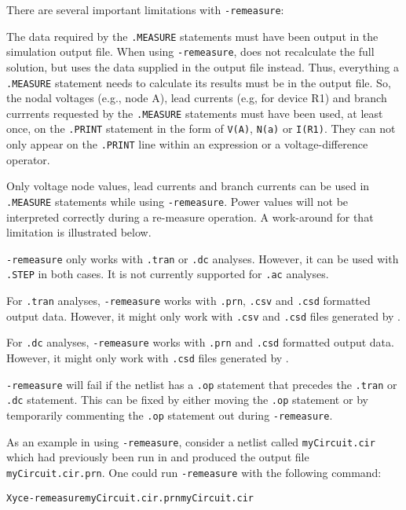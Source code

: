 There are several important limitations with {\tt -remeasure}:
\begin{XyceItemize}
  \item The data required by the {\tt .MEASURE} statements must have been output 
  in the simulation output file.  When using {\tt -remeasure}, \Xyce{} does not 
  recalculate the full solution, but uses the data supplied in the output
  file instead.  Thus, everything a {\tt .MEASURE} statement needs to calculate its 
  results must be in the output file.  So, the nodal voltages (e.g., node A), lead
  currents (e.g, for device R1) and branch currrents requested by the {\tt .MEASURE} 
  statements must have been used, at least once, on the {\tt .PRINT} statement in the 
  form of {\tt V(A)}, {\tt N(a)} or {\tt I(R1)}.  They can not only appear on the 
  {\tt .PRINT} line within an expression or a voltage-difference operator.  
  \item Only voltage node values, lead currents and branch currents can be used in 
  {\tt .MEASURE} statements while using {\tt -remeasure}.  Power values will not be 
  interpreted correctly during a re-measure operation.  A work-around for that 
  limitation is illustrated below.
  \item {\tt -remeasure} only works with {\tt .tran} or {\tt .dc} analyses.  However, 
  it can be used with {\tt .STEP} in both cases. It is not currently supported for 
  {\tt .ac} analyses.
  \item For {\tt .tran} analyses, {\tt -remeasure} works with {\tt .prn}, {\tt .csv} and 
  {\tt .csd} formatted output data.  However, it might only work with {\tt .csv} and {\tt .csd} 
  files generated by \Xyce{}.
  \item For {\tt .dc} analyses, {\tt -remeasure} works with {\tt .prn} and {\tt .csd} 
  formatted output data.   However, it might only work with {\tt .csd}  files 
  generated by \Xyce{}.
  \item {\tt -remeasure} will fail if the netlist has a {\tt .op} statement that precedes
  the {\tt .tran} or {\tt .dc} statement.  This can be fixed by either moving the {\tt .op}
  statement or by temporarily commenting the {\tt .op} statement out during {\tt -remeasure}.
\end{XyceItemize}

As an example in using {\tt -remeasure}, consider a netlist called {\tt myCircuit.cir} which 
had previously been run in \Xyce{} and produced the output file {\tt myCircuit.cir.prn}.  One 
could run {\tt -remeasure} with the following command:
\begin{alltt}
Xyce -remeasure myCircuit.cir.prn myCircuit.cir
\end{alltt}

